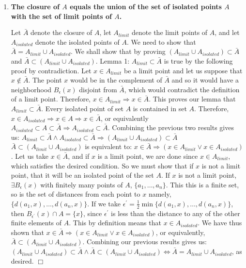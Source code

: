 \documentclass[5pt,letterpaper,reqno]{amsart}
\begin{document}
\begin{enumerate}[1.]
\begin{flushleft}
\end{flushleft}
\newpage
\item \textbf{The closure of $A$ equals the union of the set of isolated points $A$ with the set of limit points of $A$.}
\begin{flushleft}
    Let $\bar{A}$ denote the closure of $A$, let $A_{limit}$ denote the limit points of $A$, and let $A_{isolated}$ denote the isolated points of $A$. We need to show that $\bar{A} = A_{limit} \cup A_{isolated}$. We shall show that by proving $(A_{limit} \cup A_{isolated}) \subset \bar{A}$ and $\bar{A} \subset (A_{limit} \cup A_{isolated})$. \newline Lemma 1: $A_{limit} \subset \bar{A}$ is true by the following proof by contradiction. Let $x \in A_{limit}$ be a limit point and let us suppose that $x \not\in \bar{A}$. The point $x$ would be in the complement of $\bar{A}$ and so it would have a neighborhood $B_\epsilon(x)$ disjoint from $\bar{A}$, which would contradict the definition of a limit point. Therefore, $x \in A_{limit} \Rightarrow x \in \bar{A}$. This proves our lemma that $A_{limit} \subset \bar{A}$.
    \newline Every isolated point of set $A$ is contained in set $A$. Therefore, $x \in A_{isolated} \Rightarrow x \in A \Rightarrow x \in \bar{A}$, or equivalently $A_{isolated} \subset A \subset \bar{A} \Rightarrow A_{isolated} \subset \bar{A}$. Combining the previous two results gives us: $A_{limit} \subset \bar{A} \wedge A_{isolated} \subset \bar{A} \Rightarrow (A_{limit} \cup A_{isolated}) \subset \bar{A}$
    \newline $\bar{A} \subset (A_{limit} \cup A_{isolated})$ is equivalent to: $x \in \bar{A} \Rightarrow (x \in A_{limit} \vee x \in A_{isolated})$. Let us take $x \in \bar{A}$, and if $x$ is a limit point, we are done since $x \in A_{limit}$, which satisfies the desired condition. So we must show that if $x$ is not a limit point, that it will be an isolated point of the set $A$. If $x$ is not a limit point, $\exists B_\epsilon(x)$ with finitely many points of $A$, $\{a_1, \ldots, a_n\}$. This this is a finite set, so is the set of distances from each point to $x$ namely, $\{d(a_1,x), \ldots, d(a_n, x)\}$. If we take $\epsilon^\prime = \frac{1}{2} \min\{d(a_1,x), \ldots, d(a_n, x)\}$, then $B_{\epsilon^\prime}(x) \cap A = \{x\}$, since $\epsilon^\prime$ is less than the distance to any of the other finite elements of $A$. This by definition means that $x \in A_{isolated}$. We have thus shown that $x \in \bar{A} \Rightarrow (x \in A_{limit} \vee x \in A_{isolated})$, or equivalently, $\bar{A} \subset (A_{limit} \cup A_{isolated})$. Combining our previous results gives us: $(A_{limit} \cup A_{isolated}) \subset \bar{A} \wedge \bar{A} \subset (A_{limit} \cup A_{isolated}) \Leftrightarrow \bar{A} = A_{limit} \cup A_{isolated}$, as desired. $\Box$

\end{flushleft}
\end{enumerate}
\end{document}
